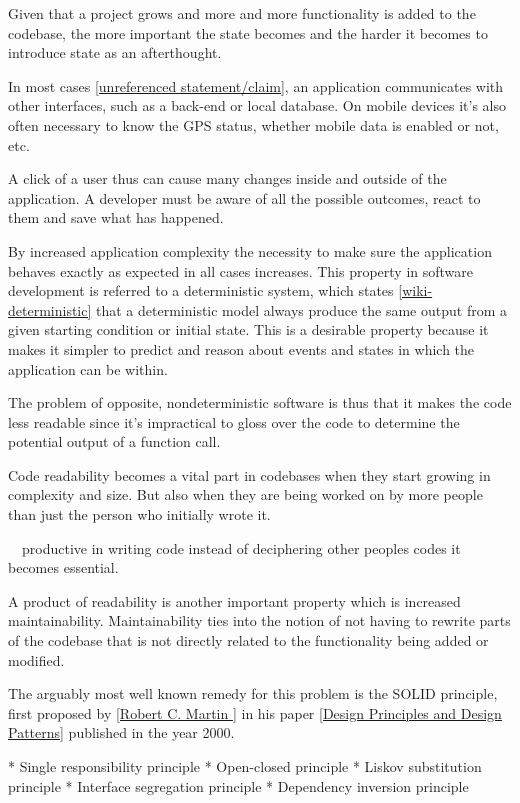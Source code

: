 Given that a project grows and more and more functionality is added to the codebase, the more 
important the state becomes and the harder it becomes to introduce state as an afterthought.

In most cases \ref{unreferenced statement/claim}, an application communicates with other interfaces, such as a back-end or local database.
On mobile devices it's also often necessary to know the GPS status, whether mobile data is enabled or not, etc. 

A click of a user thus can cause many changes inside and outside of the application.
A developer must be aware of all the possible outcomes, react to them and save what has happened.

By increased application complexity the necessity to make sure the application behaves exactly
as expected in all cases increases. This property in software development is referred to a deterministic system, 
which states \ref{wiki-deterministic} that a deterministic model always produce the same output from a given starting
condition or initial state. This is a desirable property because it makes it simpler to predict and reason about events and states
in which the application can be within.

The problem of opposite, nondeterministic software is thus that it makes the code less readable since
it's impractical to gloss over the code to determine the potential output of a function call.

Code readability becomes a vital part in codebases when they start growing in complexity and size. But also 
when they are being worked on by more people than just the person who initially wrote it.

~~productive in writing code instead of deciphering other peoples codes it becomes essential.~~

A product of readability is another important property which is increased maintainability.
Maintainability ties into the notion of not having to rewrite parts of the codebase
that is not directly related to the functionality being added or modified.

The arguably most well known remedy for this problem is the SOLID principle, first
proposed by \ref{Robert C. Martin } in his paper \ref{Design Principles and Design Patterns}
published in the year 2000.

* Single responsibility principle
* Open-closed principle
* Liskov substitution principle
* Interface segregation principle
* Dependency inversion principle


